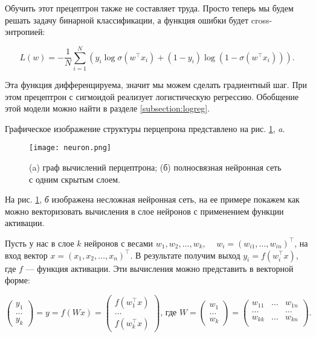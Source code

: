 Обучить этот прецептрон также не составляет труда. Просто теперь мы будем решать задачу бинарной
классификации, а функция ошибки будет cross-энтропией:

\begin{equation}
 L(w) = -\frac{1}{N}\sum_{i=1}^N(y_i\log\sigma(w^\top x_i) + (1-y_i)\log(1-\sigma(w^\top x_i))).
\end{equation}

Эта функция дифференцируема, значит мы можем сделать градиентный шаг. При этом прецептрон с сигмоидой
реализует логистическую регрессию. Обобщение этой модели можно найти в разделе \ref{subsection:logreg}.

Графическое изображение структуры перцепрона представлено на рис. \ref{fig:neuron}, \textit{a}.

\begin{figure}[ht]
    \centering
    \texttt{[image: neuron.png]}
    \caption{(a) граф вычислений перцептрона; (б) полносвязная нейронная сеть с одним скрытым слоем.}
    \label{fig:neuron}
\end{figure}

На  рис. \ref{fig:neuron}, \textit{б} изображена несложная нейронная сеть, на ее примере покажем как можно
векторизовать вычисления в слое нейронов с применением функции активации.

Пусть у нас в слое $k$ нейронов с весами $w_1, w_2, \ldots, w_k$, $\quad w_i = (w_{i1}, \ldots, w_{in})^\top$,
на вход вектор $x = (x_1, x_2, \ldots, x_n)^\top$. В результате получим выход $y_i = f(w_i^\top x)$, где $f$
--- функция активации. Эти вычисления можно представить в векторной форме:

\begin{equation*}
\begin{pmatrix}
   y_1 \\
   \ldots \\
   y_k
\end{pmatrix} = y = f(Wx) =
\begin{pmatrix}
   f(w_1^\top x)\\
   \ldots \\
   f(w_k^\top x)
\end{pmatrix}\text{, где } W =
\begin{pmatrix}
   w_1 \\
   \ldots \\
   w_k
\end{pmatrix} =
\begin{pmatrix}
   w_{11} & \ldots & w_{1n}\\
   \ldots &  & \ldots\\
   w_{kk} & \ldots & w_{kn}\\
\end{pmatrix}.
\end{equation*}


